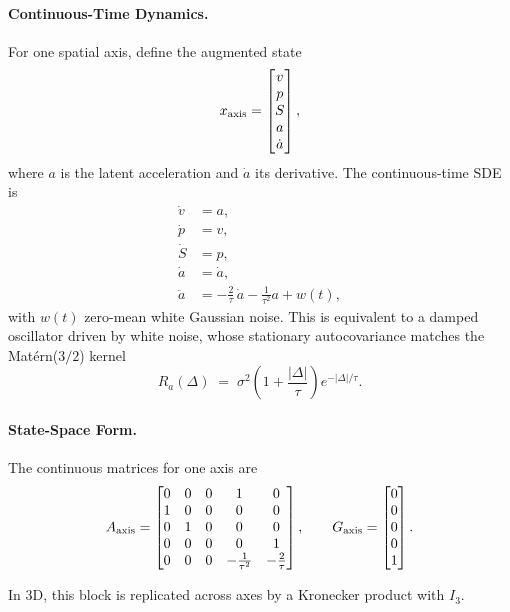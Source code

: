 \documentclass[10pt]{extarticle}
\begin{document}
\paragraph{Continuous-Time Dynamics.}
For one spatial axis, define the augmented state
\[
x_{\rm axis} =
\begin{bmatrix}
v \\ p \\ S \\ a \\ \dot a
\end{bmatrix},
\]
where $a$ is the latent acceleration and $\dot a$ its derivative. The continuous-time SDE is
\begin{align}
\dot v &= a, \\
\dot p &= v, \\
\dot S &= p, \\
\dot a &= \dot a, \\
\ddot a &= -\tfrac{2}{\tau}\,\dot a - \tfrac{1}{\tau^2} a + w(t),
\end{align}
with $w(t)$ zero-mean white Gaussian noise. This is equivalent to a damped oscillator driven by
white noise, whose stationary autocovariance matches the Mat\'ern($3/2$) kernel
\[
R_a(\Delta) \;=\; \sigma^2 \left(1 + \frac{|\Delta|}{\tau}\right)e^{-|\Delta|/\tau}.
\]

\paragraph{State-Space Form.}
The continuous matrices for one axis are
\[
A_{\rm axis} =
\begin{bmatrix}
0 & 0 & 0 & 1 & 0 \\
1 & 0 & 0 & 0 & 0 \\
0 & 1 & 0 & 0 & 0 \\
0 & 0 & 0 & 0 & 1 \\
0 & 0 & 0 & -\tfrac{1}{\tau^2} & -\tfrac{2}{\tau}
\end{bmatrix},
\qquad
G_{\rm axis} =
\begin{bmatrix}0\\0\\0\\0\\1\end{bmatrix}.
\]

In 3D, this block is replicated across axes by a Kronecker product with $I_3$.
\end{document}
